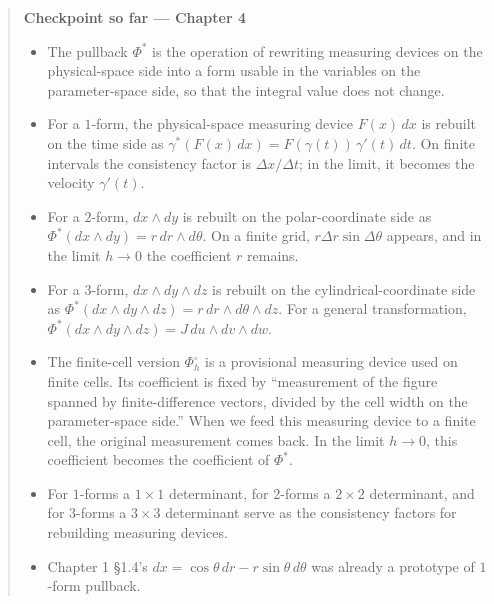 \documentclass[a4paper,12pt,openany]{book}
\begin{document}
\begin{quote}
\textbf{Checkpoint so far — Chapter 4}

\begin{itemize}
\item
  The pullback \(\Phi^*\) is the operation of rewriting measuring
  devices on the physical-space side into a form usable in the variables
  on the parameter-space side, so that the integral value does not
  change.
\item
  For a \(1\)-form, the physical-space measuring device \(F(x)\,dx\) is
  rebuilt on the time side as
  \(\gamma^*(F(x)\,dx)=F(\gamma(t))\,\gamma'(t)\,dt\). On finite
  intervals the consistency factor is \(\Delta x/\Delta t\); in the
  limit, it becomes the velocity \(\gamma'(t)\).
\item
  For a \(2\)-form, \(dx\wedge dy\) is rebuilt on the polar-coordinate
  side as \(\Phi^*(dx\wedge dy)=r\,dr\wedge d\theta\). On a finite grid,
  \(r\Delta r\sin\Delta\theta\) appears, and in the limit \(h\to0\) the
  coefficient \(r\) remains.
\item
  For a \(3\)-form, \(dx\wedge dy\wedge dz\) is rebuilt on the
  cylindrical-coordinate side as
  \(\Phi^*(dx\wedge dy\wedge dz)=r\,dr\wedge d\theta\wedge dz\). For a
  general transformation,
  \(\Phi^*(dx\wedge dy\wedge dz)=J\,du\wedge dv\wedge dw\).
\item
  The finite-cell version \(\Phi_h^\square\) is a provisional measuring
  device used on finite cells. Its coefficient is fixed by ``measurement
  of the figure spanned by finite-difference vectors, divided by the
  cell width on the parameter-space side.'' When we feed this measuring
  device to a finite cell, the original measurement comes back. In the
  limit \(h\to0\), this coefficient becomes the coefficient of
  \(\Phi^*\).
\item
  For \(1\)-forms a \(1\times1\) determinant, for \(2\)-forms a
  \(2\times2\) determinant, and for \(3\)-forms a \(3\times3\)
  determinant serve as the consistency factors for rebuilding measuring
  devices.
\item
  Chapter 1 §1.4's \(dx = \cos\theta\,dr - r\sin\theta\,d\theta\) was
  already a prototype of \(1\)-form pullback.
\end{itemize}
\end{quote}

\par\vspace{0.35em}\par
\end{document}

